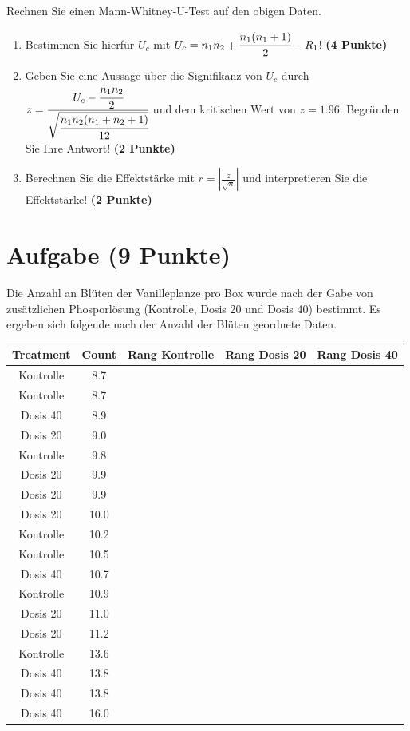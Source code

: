 \documentclass[a4paper, 10pt]{scrartcl}\usepackage[]{graphicx}\usepackage[]{xcolor}
\newenvironment{knitrout}{}{} %
\begin{document}
Rechnen Sie einen Mann-Whitney-U-Test auf den obigen Daten.

\begin{enumerate}
\item Bestimmen Sie hierf{\"u}r $U_c$ mit $U_c = n_1n_2 +
  \cfrac{n_1(n_1+1)}{2}-R_1$! \textbf{(4 Punkte)} 
\item Geben Sie eine Aussage {\"u}ber die Signifikanz von $U_c$ durch $z =
  \cfrac{U_c - \cfrac{n_1n_2}{2}}{\sqrt{\cfrac{n_1n_2(n_1+n_2+1)}{12}}}$ und
  dem kritischen Wert von $z = 1.96$. Begr{\"u}nden Sie Ihre Antwort! \textbf{(2 Punkte)} 
\item Berechnen Sie die Effektst{\"a}rke mit $r = |\frac{z}{\sqrt{n}}| $ und
  interpretieren Sie die Effektst{\"a}rke! \textbf{(2 Punkte)} 
\end{enumerate} 
\clearpage

\section{Aufgabe \hfill (9 Punkte)}



Die Anzahl an Bl{\"u}ten der Vanilleplanze pro Box wurde nach der Gabe von
zus{\"a}tzlichen Phosporl{\"o}sung (Kontrolle, Dosis 20 und Dosis 40) bestimmt. Es
ergeben sich folgende nach der Anzahl der Bl{\"u}ten geordnete Daten.

\begin{knitrout}
\color{fgcolor}\begin{table}[!h]
\centering
\begin{tabular}{ccccc}
\toprule
Treatment & Count & Rang Kontrolle & Rang Dosis 20 & Rang Dosis 40\\
\midrule
Kontrolle & 8.7 &  &  & \\
Kontrolle & 8.7 &  &  & \\
Dosis 40 & 8.9 &  &  & \\
Dosis 20 & 9.0 &  &  & \\
Kontrolle & 9.8 &  &  & \\
\addlinespace
Dosis 20 & 9.9 &  &  & \\
Dosis 20 & 9.9 &  &  & \\
Dosis 20 & 10.0 &  &  & \\
Kontrolle & 10.2 &  &  & \\
Kontrolle & 10.5 &  &  & \\
\addlinespace
Dosis 40 & 10.7 &  &  & \\
Kontrolle & 10.9 &  &  & \\
Dosis 20 & 11.0 &  &  & \\
Dosis 20 & 11.2 &  &  & \\
Kontrolle & 13.6 &  &  & \\
\addlinespace
Dosis 40 & 13.8 &  &  & \\
Dosis 40 & 13.8 &  &  & \\
Dosis 40 & 16.0 &  &  & \\
\bottomrule
\end{tabular}
\end{table}

\end{knitrout}
\end{document}
